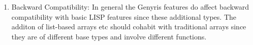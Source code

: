 \documentclass[a4paper,12pt,dvips]{article}
\begin{document}
\begin{enumerate}
\item Backward Compatibility:
In general the Genyris features do affect backward compatibility with basic LISP features since these additional types. The additon of list-based arrays etc should cohabit with traditional arrays since they are of different base types and involve different functions.
\end{enumerate}
\end{document}
